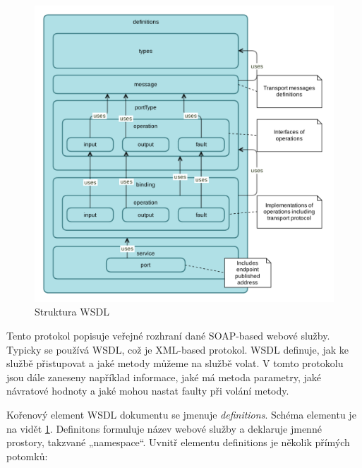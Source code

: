 \documentclass[11pt,twoside,a4paper]{book}
\begin{document}
\begin{figure}[h]
\begin{center}
\includegraphics[width=12cm]{images-pdf/wsdl.pdf} 
\caption{Struktura WSDL}
\label{fig:struktura-wsdl}
\end{center}
\end{figure}

Tento protokol popisuje veřejné rozhraní dané SOAP-based webové služby. Typicky
se používá WSDL, což je XML-based protokol. WSDL definuje, jak ke službě
přistupovat a jaké metody můžeme na službě volat. V tomto protokolu jsou dále
zaneseny například informace, jaké má metoda parametry, jaké návratové hodnoty a
jaké mohou nastat faulty při volání metody.

Kořenový element WSDL dokumentu se jmenuje \textit{definitions}. Schéma elementu
je na vidět \ref{fig:struktura-wsdl}.
Definitons formuluje název webové služby a deklaruje jmenné prostory, takzvané
„namespace“. Uvnitř elementu definitions je několik přímých potomků:
\end{document}
